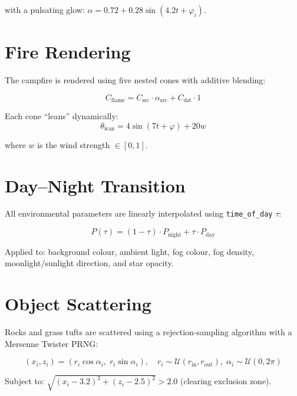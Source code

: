 \documentclass[12pt,a4paper]{report}
\begin{document}
with a pulsating glow: $\alpha = 0.72 + 0.28 \sin(4.2t + \varphi_i)$.

\section{Fire Rendering}

The campfire is rendered using five nested cones with additive blending:

\begin{equation}
C_{\text{flame}} = C_{\text{src}} \cdot \alpha_{\text{src}} + C_{\text{dst}} \cdot 1
\label{eq:addblend}
\end{equation}

Each cone ``leans'' dynamically:
\begin{equation}
\theta_{\text{lean}} = 4\sin(7t + \varphi) + 20w
\label{eq:lean}
\end{equation}

where $w$ is the wind strength $\in [0,1]$.

\section{Day--Night Transition}

All environmental parameters are linearly interpolated using \texttt{time\_of\_day} $\tau$:

\begin{equation}
P(\tau) = (1 - \tau) \cdot P_{\text{night}} + \tau \cdot P_{\text{day}}
\label{eq:daycycle}
\end{equation}

Applied to: background colour, ambient light, fog colour, fog density, moonlight/sunlight direction, and star opacity.

\section{Object Scattering}

Rocks and grass tufts are scattered using a rejection-sampling algorithm with a Mersenne Twister PRNG:

\begin{equation}
(x_i, z_i) = (r_i \cos\alpha_i,\; r_i \sin\alpha_i), \quad r_i \sim \mathcal{U}(r_{\text{in}}, r_{\text{out}}),\; \alpha_i \sim \mathcal{U}(0, 2\pi)
\label{eq:scatter}
\end{equation}

Subject to: $\sqrt{(x_i - 3.2)^2 + (z_i - 2.5)^2} > 2.0$ (clearing exclusion zone).
\end{document}
